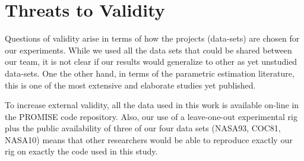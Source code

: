 \documentclass[smallcondesed]{svjour3}
\begin{document}
\section{Threats to Validity}









Questions of validity arise in terms of how the
projects (data-sets) are chosen for our experiments.
While we used all the data sets that could be shared
between our team, it is not clear if our results
would generalize to other as yet unstudied
data-sets. One the other hand, in terms of the
parametric estimation literature, this is one of the most extensive
and elaborate studies yet published.

To increase external
validity, all the data used in this work is available
on-line in the PROMISE code repository. Also, our use of a leave-one-out experimental rig
plus the public availability of three of our four data sets (NASA93, COC81, NASA10)
means that other researchers would be able to reproduce exactly
our rig on exactly the code used in this study.
\end{document}
